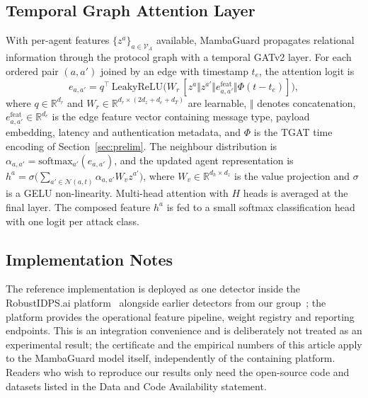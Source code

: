 \documentclass{ieeeaccess}
\newcommand{\R}{\mathbb{R}}
\newcommand{\calN}{\mathcal{N}}
\newcommand{\calV}{\mathcal{V}}
\begin{document}
\subsection{Temporal Graph Attention Layer}
\label{sec:gat}
With per-agent features $\{z^{a}\}_{a\in\calV_{A}}$ available, MambaGuard propagates relational information through the protocol graph with a temporal GATv2 layer. For each ordered pair $(a,a')$ joined by an edge with timestamp $t_{e}$, the attention logit is
\begin{equation}
e_{a,a'} = q^{\top}\,\mathrm{LeakyReLU}\!\bigl(W_{r}\,[z^{a}\Vert z^{a'}\Vert e_{a,a'}^{\text{feat}}\Vert\Phi(t-t_{e})]\bigr),
\label{eq:gatv2}
\end{equation}
where $q\in\R^{d_{r}}$ and $W_{r}\in\R^{d_{r}\times(2d_{z}+d_{e}+d_{T})}$ are learnable, $\Vert$ denotes concatenation, $e_{a,a'}^{\text{feat}}\in\R^{d_{e}}$ is the edge feature vector containing message type, payload embedding, latency and authentication metadata, and $\Phi$ is the TGAT time encoding of Section~\ref{sec:prelim}. The neighbour distribution is $\alpha_{a,a'}=\mathrm{softmax}_{a'}(e_{a,a'})$, and the updated agent representation is $h^{a}=\sigma\bigl(\sum_{a'\in\calN(a,t)}\alpha_{a,a'}W_{v}z^{a'}\bigr)$, where $W_{v}\in\R^{d_{h}\times d_{z}}$ is the value projection and $\sigma$ is a GELU non-linearity. Multi-head attention with $H$ heads is averaged at the final layer. The composed feature $h^{a}$ is fed to a small softmax classification head with one logit per attack class.

\subsection{Implementation Notes}
\label{sec:integration}
The reference implementation is deployed as one detector inside the RobustIDPS.ai platform~\cite{Anonymous2026RobustIDPS} alongside earlier detectors from our group~\cite{Anonymous2026MambaShield,Anonymous2026HGP,Anonymous2026TANODE,Anonymous2024Adversarial,Anonymous2025SMT,Anonymous2024ElCon}; the platform provides the operational feature pipeline, weight registry and reporting endpoints. This is an integration convenience and is deliberately not treated as an experimental result; the certificate and the empirical numbers of this article apply to the MambaGuard model itself, independently of the containing platform. Readers who wish to reproduce our results only need the open-source code and datasets listed in the Data and Code Availability statement.
\end{document}
